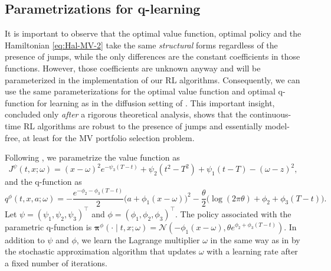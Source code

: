 \documentclass[11pt]{article}
\newcommand{\1}{\mathbbm{1}}
\newcommand{\bpi}{\boldsymbol{\pi}}
\begin{document}
\subsection{Parametrizations for q-learning}
It is important to observe that the optimal value function, optimal policy and the Hamiltonian \eqref{eq:Hal-MV-2} take the same {\it structural} forms regardless of the presence of jumps, while the only differences are the constant coefficients in those functions. However, those coefficients are unknown anyway and will be parameterized in the implementation of our RL algorithms.  Consequently,  we can use the same parameterizations for the optimal value function and optimal q-function for learning as in the diffusion setting of \cite{jia2022q}. This important insight, concluded only {\it after} a rigorous theoretical analysis, shows that the continuous-time RL algorithms are robust to the presence of jumps and essentially model-free, at least for the MV portfolio selection problem.

Following \cite{jia2022q}, we parametrize the value function as
\begin{equation}
	J^\psi(t, x ; \omega)=(x-\omega)^2 e^{-\psi_3(T-t)}+\psi_2(t^2-T^2)+\psi_1(t-T)-(\omega-z)^2,\label{eq:MV-vf}
\end{equation}
and the q-function as
\begin{equation}
	q^\phi(t, x, a ;\omega)=-\frac{e^{-\phi_2-\phi_3(T-t)}}{2}\big(a+\phi_1(x-\omega)\big)^2-\frac{\theta}{2}\big(\log(2 \pi \theta)+\phi_2+\phi_3(T-t)\big).\label{eq:MV-qf}
\end{equation}
Let $\psi=\left(\psi_1, \psi_2, \psi_3\right)^{\top}$ and $\phi=\left(\phi_1, \phi_2, \phi_3\right)^{\top}$.
The policy associated with the parametric q-function is ${\bpi}^\phi(\cdot \mid t, x ; \omega)=\mathcal{N}(-\phi_1(x-\omega), \theta e^{\phi_2+\phi_3(T-t)})$. In addition to $\psi$ and $\phi$, we learn the Lagrange multiplier $\omega$ in the same way as in \cite{jia2022q} by the stochastic approximation algorithm that updates $\omega$ with a learning rate after a fixed number of iterations.
\end{document}
